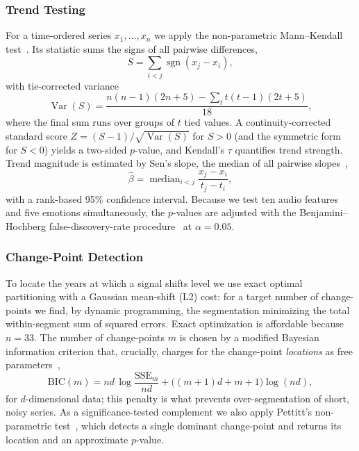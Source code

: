 \documentclass[conference]{IEEEtran}
\begin{document}
\subsubsection{Trend Testing}
For a time-ordered series $x_1,\dots,x_n$ we apply the non-parametric
Mann--Kendall test~\cite{b_mk}. Its statistic sums the signs of all pairwise
differences,
\begin{equation}
S = \sum_{i<j} \operatorname{sgn}(x_j - x_i),
\end{equation}
with tie-corrected variance
\begin{equation}
\operatorname{Var}(S) = \frac{n(n-1)(2n+5) - \sum_t t(t-1)(2t+5)}{18},
\end{equation}
where the final sum runs over groups of $t$ tied values. A continuity-corrected
standard score $Z = (S-1)/\sqrt{\operatorname{Var}(S)}$ for $S>0$ (and the
symmetric form for $S<0$) yields a two-sided $p$-value, and Kendall's $\tau$
quantifies trend strength. Trend magnitude is estimated by Sen's slope, the
median of all pairwise slopes~\cite{b_sen},
\begin{equation}
\hat{\beta} = \operatorname{median}_{i<j} \frac{x_j - x_i}{t_j - t_i},
\end{equation}
with a rank-based 95\% confidence interval. Because we test ten audio features
and five emotions simultaneously, the $p$-values are adjusted with the
Benjamini--Hochberg false-discovery-rate procedure~\cite{b_bh} at
$\alpha = 0.05$.

\subsubsection{Change-Point Detection}
To locate the years at which a signal shifts level we use exact optimal
partitioning with a Gaussian mean-shift (L2) cost: for a target number of
change-points we find, by dynamic programming, the segmentation minimizing the
total within-segment sum of squared errors. Exact optimization is affordable
because $n = 33$. The number of change-points $m$ is chosen by a modified
Bayesian information criterion that, crucially, charges for the change-point
\emph{locations} as free parameters~\cite{b_bic},
\begin{equation}
\mathrm{BIC}(m) = nd\,\log\!\frac{\mathrm{SSE}_m}{nd}
                 + \big((m{+}1)d + m + 1\big)\log(nd),
\end{equation}
for $d$-dimensional data; this penalty is what prevents over-segmentation of
short, noisy series. As a significance-tested complement we also apply Pettitt's
non-parametric test~\cite{b_pettitt}, which detects a single dominant
change-point and returns its location and an approximate $p$-value.
\end{document}
